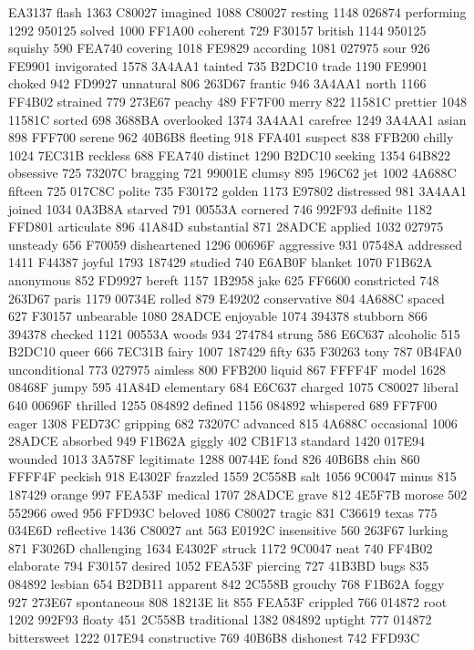 EA3137 flash 1363 C80027 imagined 1088 C80027 resting 1148 026874
performing 1292 950125 solved 1000 FF1A00 coherent 729 F30157 british
1144 950125 squishy 590 FEA740 covering 1018 FE9829 according 1081
027975 sour 926 FE9901 invigorated 1578 3A4AA1 tainted 735 B2DC10 trade
1190 FE9901 choked 942 FD9927 unnatural 806 263D67 frantic 946 3A4AA1
north 1166 FF4B02 strained 779 273E67 peachy 489 FF7F00 merry 822
11581C prettier 1048 11581C sorted 698 3688BA overlooked 1374 3A4AA1
carefree 1249 3A4AA1 asian 898 FFF700 serene 962 40B6B8 fleeting 918
FFA401 suspect 838 FFB200 chilly 1024 7EC31B reckless 688 FEA740
distinct 1290 B2DC10 seeking 1354 64B822 obsessive 725 73207C bragging
721 99001E clumsy 895 196C62 jet 1002 4A688C fifteen 725 017C8C polite
735 F30172 golden 1173 E97802 distressed 981 3A4AA1 joined 1034 0A3B8A
starved 791 00553A cornered 746 992F93 definite 1182 FFD801 articulate
896 41A84D substantial 871 28ADCE applied 1032 027975 unsteady 656
F70059 disheartened 1296 00696F aggressive 931 07548A addressed 1411
F44387 joyful 1793 187429 studied 740 E6AB0F blanket 1070 F1B62A
anonymous 852 FD9927 bereft 1157 1B2958 jake 625 FF6600 constricted 748
263D67 paris 1179 00734E rolled 879 E49202 conservative 804 4A688C
spaced 627 F30157 unbearable 1080 28ADCE enjoyable 1074 394378 stubborn
866 394378 checked 1121 00553A woods 934 274784 strung 586 E6C637
alcoholic 515 B2DC10 queer 666 7EC31B fairy 1007 187429 fifty 635
F30263 tony 787 0B4FA0 unconditional 773 027975 aimless 800 FFB200
liquid 867 FFFF4F model 1628 08468F jumpy 595 41A84D elementary 684
E6C637 charged 1075 C80027 liberal 640 00696F thrilled 1255 084892
defined 1156 084892 whispered 689 FF7F00 eager 1308 FED73C gripping 682
73207C advanced 815 4A688C occasional 1006 28ADCE absorbed 949 F1B62A
giggly 402 CB1F13 standard 1420 017E94 wounded 1013 3A578F legitimate
1288 00744E fond 826 40B6B8 chin 860 FFFF4F peckish 918 E4302F frazzled
1559 2C558B salt 1056 9C0047 minus 815 187429 orange 997 FEA53F medical
1707 28ADCE grave 812 4E5F7B morose 502 552966 owed 956 FFD93C beloved
1086 C80027 tragic 831 C36619 texas 775 034E6D reflective 1436 C80027
ant 563 E0192C insensitive 560 263F67 lurking 871 F3026D challenging
1634 E4302F struck 1172 9C0047 neat 740 FF4B02 elaborate 794 F30157
desired 1052 FEA53F piercing 727 41B3BD bugs 835 084892 lesbian 654
B2DB11 apparent 842 2C558B grouchy 768 F1B62A foggy 927 273E67
spontaneous 808 18213E lit 855 FEA53F crippled 766 014872 root 1202
992F93 floaty 451 2C558B traditional 1382 084892 uptight 777 014872
bittersweet 1222 017E94 constructive 769 40B6B8 dishonest 742 FFD93C
